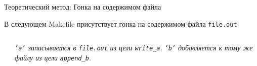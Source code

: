     \begin{frame}{Теоретический метод: Гонка на содержимом файла}

        В следующем Makefile присутствует гонка на содержимом файла \texttt{file.out}

        \begin{columns}[t]
            \begin{column}{.3 \textwidth}
                \newline
            \end{column}
            \begin{column}{.4 \textwidth}
                \newline \newline \newline
                \textit{\texttt{'a'} записывается в \texttt{file.out}}
                \newline
                \textit{из цели \texttt{write\_a}.}
                \newline
                \newline
                \textit{\texttt{'b'} добавляется к}
                \newline
                \textit{тому же файлу из цели}
                \newline
                \textit{\texttt{append\_b}.}
            \end{column}
        \end{columns}

        \vspace{1.2em}


\end{frame}
